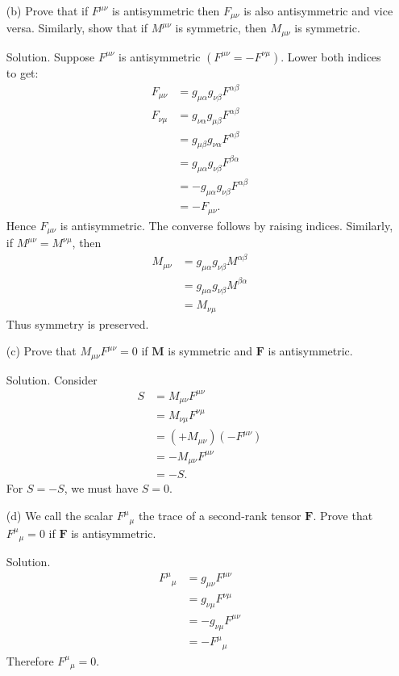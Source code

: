 \documentclass[12pt]{article}
\begin{document}
\begin{enumerate}
  \item[(b)] Prove that if $F^{\mu \nu}$ is antisymmetric then $F_{\mu \nu}$ is also antisymmetric and vice versa. Similarly, show that if $M^{\mu \nu}$ is symmetric, then $M_{\mu \nu}$ is symmetric.
  \item[Solution.]  
  Suppose $F^{\mu\nu}$ is antisymmetric $(F^{\mu\nu}=-F^{\nu\mu})$. Lower both indices to get:
  $$
  \begin{aligned}
  F_{\mu\nu} 
  &= g_{\mu\alpha} g_{\nu\beta} F^{\alpha\beta} \\
  F_{\nu\mu} 
  &= g_{\nu\alpha} g_{\mu\beta} F^{\alpha\beta} \\
  &= g_{\mu\beta} g_{\nu\alpha} F^{\alpha\beta} \\
  &= g_{\mu\alpha} g_{\nu\beta} F^{\beta\alpha} \\
  &= - g_{\mu\alpha} g_{\nu\beta} F^{\alpha\beta} \\
  &= -F_{\mu\nu}.
  \end{aligned}
  $$
  Hence $F_{\mu\nu}$ is antisymmetric. The converse follows by raising indices.  
  Similarly, if $M^{\mu\nu}=M^{\nu\mu}$, then
  $$
  \begin{aligned}
  M_{\mu\nu} 
  &= g_{\mu\alpha} g_{\nu\beta} M^{\alpha\beta} \\
  &= g_{\mu\alpha} g_{\nu\beta} M^{\beta\alpha} \\
  &= M_{\nu\mu}
  \end{aligned}
  $$
  Thus symmetry is preserved.

  \item[(c)] Prove that $M_{\mu \nu} F^{\mu \nu}=0$ if $\boldsymbol{M}$ is symmetric and $\boldsymbol{F}$ is antisymmetric.
  \item[Solution.]  
  Consider
  $$
  \begin{aligned}
  S &= M_{\mu\nu} F^{\mu\nu} \\
  &= M_{\nu\mu} F^{\nu\mu} \\
  &= (+M_{\mu\nu})(-F^{\mu\nu}) \\
  &= -M_{\mu\nu} F^{\mu\nu} \\
  &= -S.
  \end{aligned}
  $$
  For $S = -S$, we must have $S = 0$.

  \item[(d)] We call the scalar $F^\mu{ }_\mu$ the trace of a second-rank tensor $\boldsymbol{F}$. Prove that $F^\mu{ }_\mu=0$ if $\boldsymbol{F}$ is antisymmetric.
  \item[Solution.]  
  $$
  \begin{aligned}
  F^\mu{}_\mu 
  &= g_{\mu\nu} F^{\mu\nu} \\
  &= g_{\nu\mu} F^{\nu\mu} \\
  &= - g_{\nu\mu} F^{\mu\nu} \\
  &= -F^\mu{}_\mu
  \end{aligned}
  $$
  Therefore $F^\mu{}_\mu=0$.


\end{enumerate}
\end{document}
